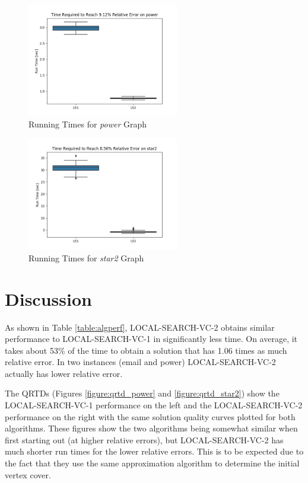 \documentclass[sigconf]{acmart}
\begin{document}
\begin{figure}[h]
	\centering
	\includegraphics[width=250px]{plots/boxplot_power.png}
	\caption{Running Times for \textit{power} Graph}
	\label{figure:boxplot_power}
\end{figure}

\begin{figure}[h]
	\centering
	\includegraphics[width=250px]{plots/boxplot_star2.png}
	\caption{Running Times for \textit{star2} Graph}
	\label{figure:boxplot_star2}
\end{figure}

\section{Discussion}
As shown in Table \ref{table:algperf}, LOCAL-SEARCH-VC-2 obtains similar performance to LOCAL-SEARCH-VC-1 in significantly less time. On average, it takes about 53\% of the time to obtain a solution that has 1.06 times as much relative error. In two instances (email and power) LOCAL-SEARCH-VC-2 actually has lower relative error.

The QRTDs (Figures \ref{figure:qrtd_power} and \ref{figure:qrtd_star2}) show the LOCAL-SEARCH-VC-1 performance on the left and the LOCAL-SEARCH-VC-2 performance on the right with the same solution quality curves plotted for both algorithms. These figures show the two algorithms being somewhat similar when first starting out (at higher relative errors), but LOCAL-SEARCH-VC-2 has much shorter run times for the lower relative errors. This is to be expected due to the fact that they use the same approximation algorithm to determine the initial vertex cover.
\end{document}
